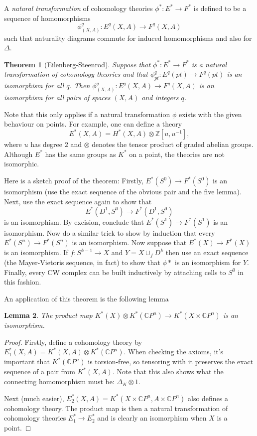 \documentclass[a4paper,10pt]{article}
\theoremstyle{plain}%
\newtheorem{thm}{Theorem}
\newtheorem{lem}[thm]{Lemma}
\theoremstyle{definition}
\theoremstyle{remark}
\newcommand{\ZZ}{\mathbb{Z}}
\newcommand{\CC}{\mathbb{C}}
\newcommand{\cp}{\CC P}   %
\newcommand{\CP}{\cp}     %
\begin{document}
A \emph{natural transformation} of cohomology theories $\phi^*: E^*
\to F^*$ is defined to be a sequence of homomorphisms
\begin{equation*}
  \phi^q_{(X,A)}: E^q(X,A) \to F^q(X,A)
\end{equation*}
such that naturality diagrams commute for induced homomorphisms and
also for $\Delta$.

\begin{thm}[Eilenberg-Steenrod]
  Suppose that $\phi^*: E^*\to F^*$ is a natural transformation of
  cohomology theories and that $\phi^q_{pt}: E^q(pt)\to F^q(pt)$ is an
  isomorphism for all $q$. Then $\phi^q_{(X,A)}: E^q(X,A)\to F^q(X,A)$
  is an isomorphism for all pairs of spaces $(X,A)$ and integers $q$.
\end{thm}

Note that this only applies if a natural transformation $\phi$ exists
with the given behaviour on points. For example, one can define a
theory
\begin{equation*}
  E^*(X,A) = H^*(X,A)\otimes \ZZ[u,u^{-1}],
\end{equation*}
where $u$ has degree $2$ and $\otimes$ denotes the tensor product of
graded abelian groups. Although $E^*$ has the same groups as $K^*$ on
a point, the theories are not isomorphic.

Here is a sketch proof of the theorem: Firstly, $E^*(S^0)\to F^*(S^0)$
is an isomorphism (use the exact sequence of the obvious pair and the
five lemma). Next, use the exact sequence again to show that
\begin{equation*}
  E^*(D^1,S^0) \to F^*(D^1,S^0)
\end{equation*}
is an isomorphism. By excision, conclude that $E^*(S^1)\to F^*(S^1)$
is an isomorphism. Now do a similar trick to show by induction that
every $E^*(S^n)\to F^*(S^n)$ is an isomorphism. Now suppose that
$E^*(X)\to F^*(X)$ is an isomorphism. If $f: S^{k-1}\to X$ and
$Y=X\cup_f D^k$ then use an exact sequence (the Mayer-Vietoris
sequence, in fact) to show that $\phi*$ is an isomorphism for
$Y$. Finally, every CW complex can be built inductively by attaching
cells to $S^0$ in this fashion.

An application of this theorem is the following lemma
\begin{lem}\label{kxcpn-kunneth}
  The product map $K^*(X)\otimes K^*(\CP^n) \to K^*(X\times \CP^n)$ is
  an isomorphism.
\end{lem}
\begin{proof}
  Firstly, define a cohomology theory by $E_1^*(X,A) = K^*(X,A)\otimes
  K^*(\CP^n)$. When checking the axioms, it's important that
  $K^*(\CP^n)$ is torsion-free, so tensoring with it preserves the
  exact sequence of a pair from $K^*(X,A)$. Note that this also shows
  what the connecting homomorphism must be: $\Delta_K\otimes 1$.

  Next (much easier), $E_2^*(X,A) = K^*(X\times \CP^n, A\times \CP^n)$
  also defines a cohomology theory. The product map is then a natural
  transformation of cohomology theories $E_1^*\to E_2^*$ and is
  clearly an isomorphism when $X$ is a point.
\end{proof}
\end{document}
